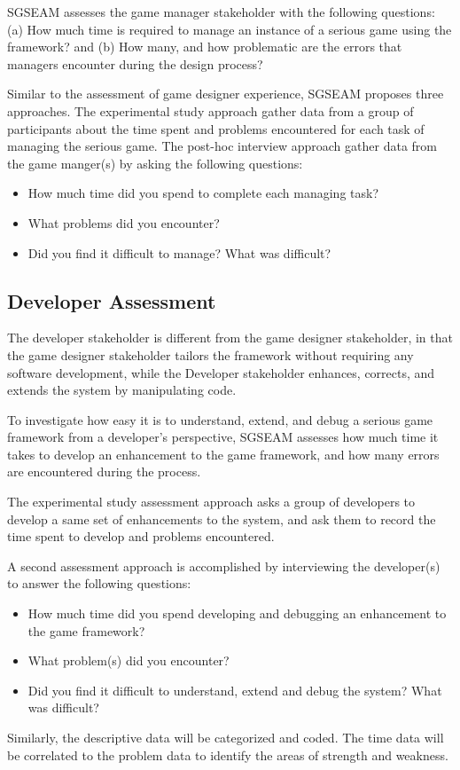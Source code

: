 SGSEAM assesses the game manager stakeholder with the following questions: (a) How much time is
required to manage an instance of a serious game using the framework? and (b) How many,
and how problematic are the errors that managers encounter during the design process?

Similar to the assessment of game designer experience, SGSEAM proposes three approaches. The
experimental study approach gather data from a group of participants about the time spent and
problems encountered for each task of managing the serious game. The post-hoc interview approach
gather data from the game manger(s) by asking the following questions:

\begin{itemize}
\item How much time did you spend to complete each managing task?
\item What problems did you encounter?
\item Did you find it difficult to manage? What was difficult?
\end{itemize}

\subsection{Developer Assessment}

The developer stakeholder is different from the game designer stakeholder, in that the
game designer stakeholder tailors the framework without requiring any software
development, while the Developer stakeholder enhances, corrects, and extends the system by
manipulating code. 

To investigate how easy it is to understand, extend, and debug a serious game
framework from a developer's perspective, SGSEAM assesses how much time it takes to develop an
enhancement to the game framework, and how many errors are encountered
during the process.

The experimental study assessment approach asks a group of developers to develop a same set of
enhancements to the system, and ask them to record the time spent to develop and problems
encountered.

A second assessment approach is accomplished by interviewing the developer(s) to
answer the following questions:

\begin{itemize}
\item How much time did you spend developing and debugging an
  enhancement to the game framework?
\item What problem(s) did you encounter?
\item Did you find it difficult to understand, extend and debug the
  system? What was difficult?
\end{itemize}

Similarly, the descriptive data will be categorized and coded. The time data will be correlated to the problem data to identify the areas of strength and weakness.
